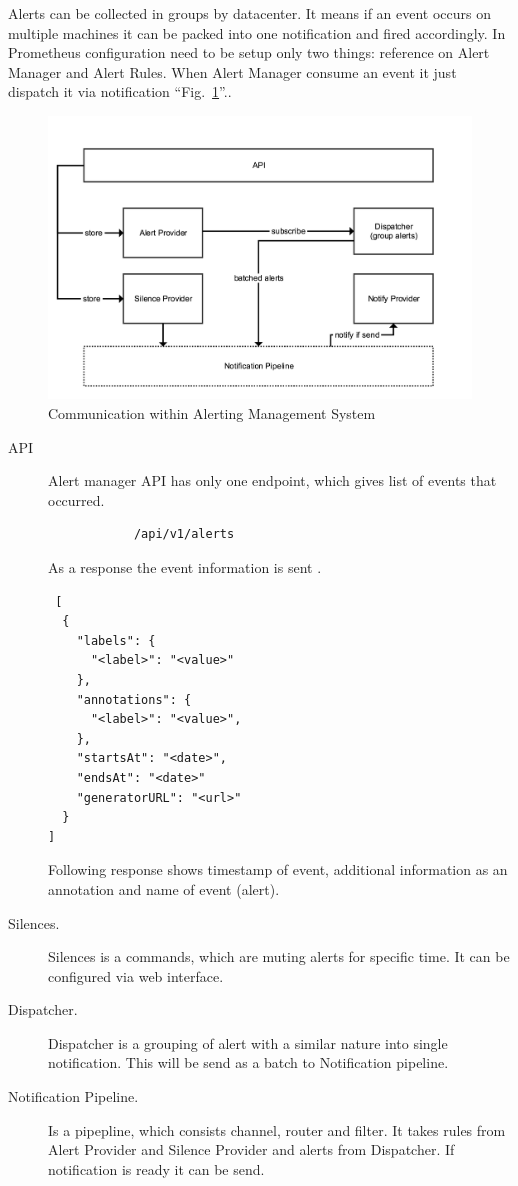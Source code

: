 Alerts can be collected in groups by datacenter. It means if an event occurs on multiple machines it can be packed into one notification and fired accordingly. 
In Prometheus configuration need to be setup only two things: reference on Alert Manager and Alert Rules. When Alert Manager consume an event it just dispatch it via notification ``Fig.~\ref{fig:alert_arch_detailed}''..

\begin{figure}[htbp]
\begin{center}
  \includegraphics[width=\linewidth]{components/3/alert_details.png}
  \caption{Communication within Alerting Management System}
  \label{fig:alert_arch_detailed}
\end{center}
\end{figure}

\begin{description}
\item[API] Alert manager API has only one endpoint, which gives list of events that occurred.
\begin{lstlisting}
			/api/v1/alerts
\end{lstlisting}

As a response the event information is sent \cite{alert_send}.
 \begin{lstlisting}
 [
  {
    "labels": {
      "<label>": "<value>"
    },
    "annotations": {
      "<label>": "<value>",
    },
    "startsAt": "<date>",
    "endsAt": "<date>"
    "generatorURL": "<url>"
  }
]
\end{lstlisting}
Following response shows timestamp of event, additional information as an annotation and name of event (alert). 
\item[Silences.] Silences is a commands, which are muting alerts for specific time. It can be configured via web interface. 
\item[Dispatcher.] Dispatcher is a grouping of alert with a similar nature into single notification. This will be send as a batch to Notification pipeline.
\item[Notification Pipeline.] Is a pipepline, which consists channel, router and filter. It takes rules from Alert Provider and Silence Provider and alerts from Dispatcher. If notification is ready it can be send. 
\end{description}


